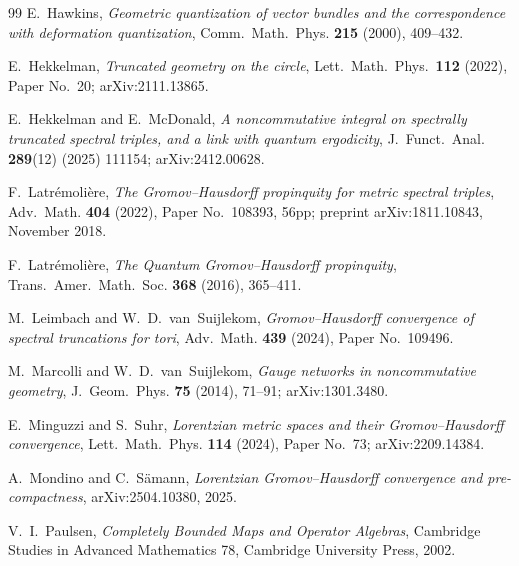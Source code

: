 \documentclass[11pt,a4paper]{article}
\theoremstyle{plain}
\theoremstyle{definition}
\begin{document}
\begin{thebibliography}{99}
E.~Hawkins,
\newblock \emph{Geometric quantization of vector bundles and the
correspondence with deformation quantization},
\newblock Comm.~Math.~Phys. \textbf{215} (2000), 409--432.

E.~Hekkelman,
\newblock \emph{Truncated geometry on the circle},
\newblock Lett.\ Math.\ Phys.\ \textbf{112} (2022), Paper No.~20;
\newblock arXiv:2111.13865.

E.~Hekkelman and E.~McDonald,
\newblock \emph{A noncommutative integral on spectrally truncated
spectral triples, and a link with quantum ergodicity},
\newblock J.~Funct.~Anal. \textbf{289}(12) (2025) 111154;
\newblock arXiv:2412.00628.

F.~Latr\'emoli\`ere,
\newblock \emph{The Gromov--Hausdorff propinquity for metric
spectral triples},
\newblock Adv.~Math. \textbf{404} (2022), Paper No.~108393, 56pp;
\newblock preprint arXiv:1811.10843, November 2018.

F.~Latr\'emoli\`ere,
\newblock \emph{The Quantum Gromov--Hausdorff propinquity},
\newblock Trans.~Amer.~Math.~Soc. \textbf{368} (2016), 365--411.

M.~Leimbach and W.~D.~van~Suijlekom,
\newblock \emph{Gromov--Hausdorff convergence of spectral
truncations for tori},
\newblock Adv.~Math. \textbf{439} (2024), Paper No.~109496.

M.~Marcolli and W.~D.~van~Suijlekom,
\newblock \emph{Gauge networks in noncommutative geometry},
\newblock J.~Geom.~Phys. \textbf{75} (2014), 71--91;
\newblock arXiv:1301.3480.

E.~Minguzzi and S.~Suhr,
\newblock \emph{Lorentzian metric spaces and their Gromov--Hausdorff
convergence},
\newblock Lett.~Math.~Phys. \textbf{114} (2024), Paper No.~73;
\newblock arXiv:2209.14384.

A.~Mondino and C.~S\"amann,
\newblock \emph{Lorentzian Gromov--Hausdorff convergence
and pre-compactness},
\newblock arXiv:2504.10380, 2025.

V.~I.~Paulsen,
\newblock \emph{Completely Bounded Maps and Operator Algebras},
\newblock Cambridge Studies in Advanced Mathematics 78,
Cambridge University Press, 2002.


\end{thebibliography}
\end{document}
